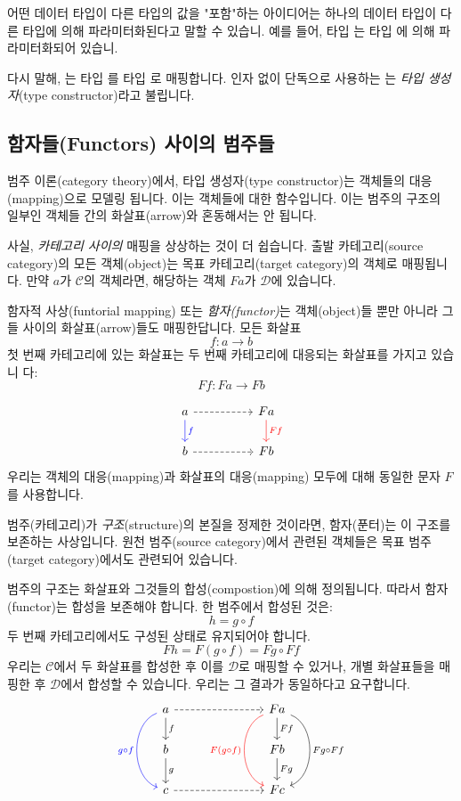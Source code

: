 \documentclass[DaoFP]{subfiles}
\begin{document}
어떤 데이터 타입이 다른 타입의 값을 "포함"하는 아이디어는 하나의 데이터 타입이 다른 타입에 의해 파라미터화된다고 말할 수 있습니. 예를 들어, 타입 는 타입 에 의해 파라미터화되어 있습니.

다시 말해, 는 타입 를 타입 로 매핑합니다. 인자 없이 단독으로 사용하는 는 \emph{타입 생성자}(type constructor)라고 불립니다.

\subsection{함자들(Functors) 사이의 범주들}
범주 이론(category theory)에서, 타입 생성자(type constructor)는 객체들의 대응(mapping)으로 모델링 됩니다. 이는 객체들에 대한 함수입니다. 이는 범주의 구조의 일부인 객체들 간의 화살표(arrow)와 혼동해서는 안 됩니다.

사실, \emph{카테고리 사이의} 매핑을 상상하는 것이 더 쉽습니다. 출발 카테고리(source category)의 모든 객체(object)는 목표 카테고리(target category)의 객체로 매핑됩니다. 만약 $a$가 $\mathcal{C}$의 객체라면, 해당하는 객체 $F a$가 $\mathcal{D}$에 있습니다.

함자적 사상(funtorial mapping) 또는 \emph{함자(functor)}는 객체(object)들 뿐만 아니라 그들 사이의 화살표(arrow)들도 매핑한답니다. 모든 화살표
\[ f \colon a \to b\]
첫 번째 카테고리에 있는 화살표는 두 번째 카테고리에 대응되는 화살표를 가지고 있습니 다:
\[ F f \colon F a \to F b\]


\[
 \begin{tikzcd}
 a 
 \arrow[d, blue, "f"]
\arrow[rr, dashed]
 && F a
  \arrow[d, red, "F f"]
 \\
 b 
 \arrow[rr, dashed]
&& F b
  \end{tikzcd}
\]
우리는 객체의 대응(mapping)과 화살표의 대응(mapping) 모두에 대해 동일한 문자 $F$를 사용합니다.

범주(카테고리)가 \emph{구조}(structure)의 본질을 정제한 것이라면, 함자(푼터)는 이 구조를 보존하는 사상입니다. 원천 범주(source category)에서 관련된 객체들은 목표 범주(target category)에서도 관련되어 있습니다.

범주의 구조는 화살표와 그것들의 합성(compostion)에 의해 정의됩니다. 따라서 함자(functor)는 합성을 보존해야 합니다. 한 범주에서 합성된 것은:
\[ h = g \circ f \]
두 번째 카테고리에서도 구성된 상태로 유지되어야 합니다.
\[ F h = F (g \circ f) = F g \circ F f \]
우리는 $\mathcal{C}$에서 두 화살표를 합성한 후 이를 $\mathcal{D}$로 매핑할 수 있거나, 개별 화살표들을 매핑한 후 $\mathcal{D}$에서 합성할 수 있습니다. 우리는 그 결과가 동일하다고 요구합니다.
\[
 \begin{tikzcd}
 a 
 \arrow[d, "f"]
\arrow[rrr, dashed]
\arrow[dd, bend right = 70, blue, "g \circ f"']
 &&& F a
  \arrow[d, "F f"]
  \arrow[dd, bend left = 70, "F g \circ F f"]
  \arrow[dd, bend right = 70, red, "F (g \circ f)"']
 \\
 b 
 \arrow[d, "g"]
&&& F b
 \arrow[d, "F g"]
 \\
 c
 \arrow[rrr, dashed]
&&& F c
  \end{tikzcd}
\]
\end{document}
